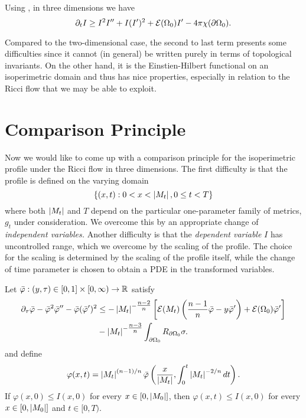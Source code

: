 \documentclass{amsart}
\begin{document}
Using , in three dimensions we have
\begin{equation}
\label{eq:3d_viscosity_ricciflow}
\partial_t I \geq I^2I'' + I(I')^2 + \operatorname{\mathcal{E}}({\Omega_0})I' - 4\pi\chi(\partial {\Omega_0}).
\end{equation}


Compared to the two-dimensional case, the second to last term presents some difficulties since it cannot (in general) be written purely in terms of topological invariants. On the other hand, it is the Einstien-Hilbert functional on an isoperimetric domain and thus has nice properties, especially in relation to the Ricci flow that we may be able to exploit.


\section{Comparison Principle}
\label{sec:comparison}

Now we would like to come up with a comparison principle for the isoperimetric profile under the Ricci flow in three dimensions. The first difficulty is that the profile is defined on the varying domain
\[
\{(x, t) : 0 < x < \left|{M_t}\right|, 0 \leq t < T\}
\]
where both \(\left|{M_t}\right|\) and \(T\) depend on the particular one-parameter family of metrics, \(g_t\) under consideration. We overcome this by an appropriate change of \emph{independent variables.} Another difficulty is that the \emph{dependent variable} \(I\) has uncontrolled range, which we overcome by the scaling of the profile. The choice for the scaling is determined by the scaling of the profile itself, while the change of time parameter is chosen to obtain a PDE in the transformed variables.

\begin{thm}
\label{thm:comparison}
Let \(\bar{\varphi} : (y, \tau) \in [0, 1] \times [0, \infty) \to \mathbb{R}\) satisfy
\[
\begin{split}
\partial_{\tau} \bar{\varphi} - \bar{\varphi}^2 \bar{\varphi}'' - \bar{\varphi}(\bar{\varphi}')^2 &\leq -\left|{M_t}\right|^{-\tfrac{n-2}{n}} \left[\operatorname{\mathcal{E}}(M_t)\left(\frac{n-1}{n} \bar{\varphi} - y \bar{\varphi}'\right) + \operatorname{\mathcal{E}}(\Omega_0)\bar{\varphi}'\right] \\
&- \left|{M_t}\right|^{-\tfrac{n-3}{n}}\int_{\partial {\Omega_0}} R_{\partial {\Omega_0}}\sigma.
\end{split}
\]
and define
\[
\varphi(x, t) = \left|{M_t}\right|^{(n-1)/n} \bar{\varphi} \left(\frac{x}{\left|{M_t}\right|}, \int_0^t \left|{M_t}\right|^{-2/n} dt\right).
\]
If \(\varphi(x, 0) \leq I(x, 0)\) for every \(x \in [0, \left|{M_0}\right|]\), then \(\varphi(x, t) \leq I(x, 0)\) for every \(x \in [0, \left|{M_0}\right|]\) and \(t \in [0, T)\).
\end{thm}
\end{document}

